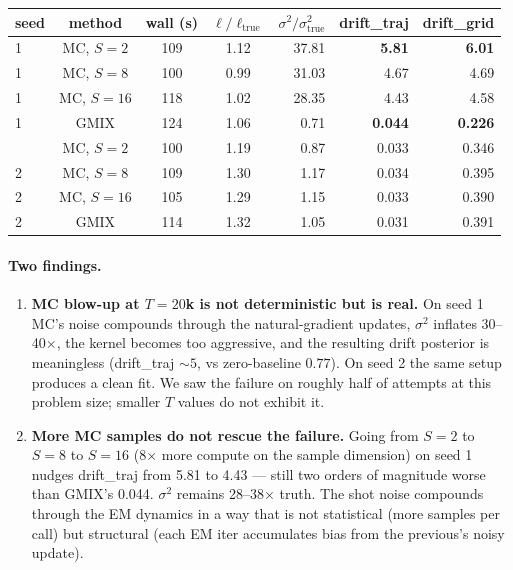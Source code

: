 \documentclass[11pt]{article}
\begin{document}
\begin{center}
\renewcommand{\arraystretch}{1.2}
\begin{tabular}{lcccrrr}
\toprule
seed & method & wall (s) & $\ell/\ell_\text{true}$ &
$\sigma^2/\sigma^2_\text{true}$ & drift\_traj & drift\_grid \\
\midrule
1 & MC, $S\!=\!2$  & 109 & 1.12 & 37.81 & \textbf{5.81} & \textbf{6.01} \\
1 & MC, $S\!=\!8$  & 100 & 0.99 & 31.03 & 4.67 & 4.69 \\
1 & MC, $S\!=\!16$ & 118 & 1.02 & 28.35 & 4.43 & 4.58 \\
1 & GMIX           & 124 & 1.06 &  0.71 & \textbf{0.044} & \textbf{0.226} \\
\addlinespace
2 & MC, $S\!=\!2$  & 100 & 1.19 &  0.87 & 0.033 & 0.346 \\
2 & MC, $S\!=\!8$  & 109 & 1.30 &  1.17 & 0.034 & 0.395 \\
2 & MC, $S\!=\!16$ & 105 & 1.29 &  1.15 & 0.033 & 0.390 \\
2 & GMIX           & 114 & 1.32 &  1.05 & 0.031 & 0.391 \\
\bottomrule
\end{tabular}
\end{center}

\paragraph{Two findings.}

\begin{enumerate}
\item \textbf{MC blow-up at $T\!=\!20$k is not deterministic but is real.}
On seed 1 MC's noise compounds through the natural-gradient updates,
$\sigma^2$ inflates 30--40$\times$, the kernel becomes too aggressive,
and the resulting drift posterior is meaningless (drift\_traj $\sim
5$, vs zero-baseline $0.77$).  On seed 2 the same setup produces a
clean fit.  We saw the failure on roughly half of attempts at this
problem size; smaller $T$ values do not exhibit it.
\item \textbf{More MC samples do not rescue the failure.}  Going from
$S\!=\!2$ to $S\!=\!8$ to $S\!=\!16$ (8$\times$ more compute on the
sample dimension) on seed 1 nudges drift\_traj from 5.81 to 4.43 ---
still two orders of magnitude worse than GMIX's 0.044.  $\sigma^2$
remains 28--38$\times$ truth.  The shot noise compounds through the
EM dynamics in a way that is not statistical (more samples per call)
but structural (each EM iter accumulates bias from the previous's
noisy update).
\end{enumerate}
\end{document}
